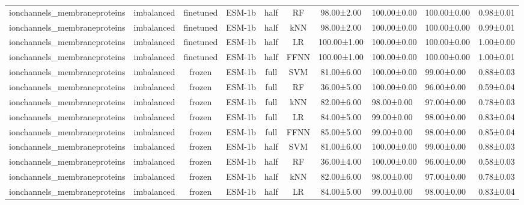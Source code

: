 \begin{tabular}{lcccccc}
    ionchannels\_membraneproteins & imbalanced &      finetuned &       ESM-1b &      half &         RF &  98.00±2.00 & 100.00±0.00 & 100.00±0.00 & 0.98±0.01 \\
    ionchannels\_membraneproteins & imbalanced &      finetuned &       ESM-1b &      half &        kNN &  98.00±2.00 & 100.00±0.00 & 100.00±0.00 & 0.99±0.01 \\
    ionchannels\_membraneproteins & imbalanced &      finetuned &       ESM-1b &      half &         LR & 100.00±1.00 & 100.00±0.00 & 100.00±0.00 & 1.00±0.00 \\
    ionchannels\_membraneproteins & imbalanced &      finetuned &       ESM-1b &      half &       FFNN & 100.00±1.00 & 100.00±0.00 & 100.00±0.00 & 1.00±0.01 \\
    ionchannels\_membraneproteins & imbalanced &         frozen &       ESM-1b &      full &        SVM &  81.00±6.00 & 100.00±0.00 &  99.00±0.00 & 0.88±0.03 \\
    ionchannels\_membraneproteins & imbalanced &         frozen &       ESM-1b &      full &         RF &  36.00±5.00 & 100.00±0.00 &  96.00±0.00 & 0.59±0.04 \\
    ionchannels\_membraneproteins & imbalanced &         frozen &       ESM-1b &      full &        kNN &  82.00±6.00 &  98.00±0.00 &  97.00±0.00 & 0.78±0.03 \\
    ionchannels\_membraneproteins & imbalanced &         frozen &       ESM-1b &      full &         LR &  84.00±5.00 &  99.00±0.00 &  98.00±0.00 & 0.83±0.04 \\
    ionchannels\_membraneproteins & imbalanced &         frozen &       ESM-1b &      full &       FFNN &  85.00±5.00 &  99.00±0.00 &  98.00±0.00 & 0.85±0.04 \\
    ionchannels\_membraneproteins & imbalanced &         frozen &       ESM-1b &      half &        SVM &  81.00±6.00 & 100.00±0.00 &  99.00±0.00 & 0.88±0.03 \\
    ionchannels\_membraneproteins & imbalanced &         frozen &       ESM-1b &      half &         RF &  36.00±4.00 & 100.00±0.00 &  96.00±0.00 & 0.58±0.03 \\
    ionchannels\_membraneproteins & imbalanced &         frozen &       ESM-1b &      half &        kNN &  82.00±6.00 &  98.00±0.00 &  97.00±0.00 & 0.78±0.03 \\
    ionchannels\_membraneproteins & imbalanced &         frozen &       ESM-1b &      half &         LR &  84.00±5.00 &  99.00±0.00 &  98.00±0.00 & 0.83±0.04 \\

\end{tabular}
